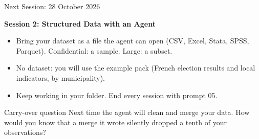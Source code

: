 \documentclass[svgnames,x11names,dvipsnames]{beamer}
\begin{document}
\begin{frame}{Next Session: 28 October 2026}

\textbf{Session 2: Structured Data with an Agent}

\vspace{0.2cm}

\begin{itemize}
    \item Bring your dataset as a file the agent can open (CSV, Excel, Stata, SPSS, Parquet). Confidential: a sample. Large: a subset.
    \item No dataset: you will use the example pack (French election results and local indicators, by municipality).
    \item Keep working in your folder. End every session with prompt 05.
\end{itemize}

\vspace{0.3cm}

\begin{alertblock}{Carry-over question}
Next time the agent will clean and merge your data. How would you know that a merge it wrote silently dropped a tenth of your observations?
\end{alertblock}

\end{frame}

\end{document}
